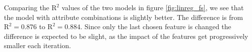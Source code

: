 
Comparing the $\text{R}^2$ values of the two models in figure \ref{fig:linreg_fs}, we see that the model with attribute combinations is slightly better. The difference is from $\text{R}^2 = 0.876$ to $\text{R}^2 = 0.884$. Since only the last chosen feature is changed the difference is expected to be slight, as the impact of the features get progressively smaller each iteration.